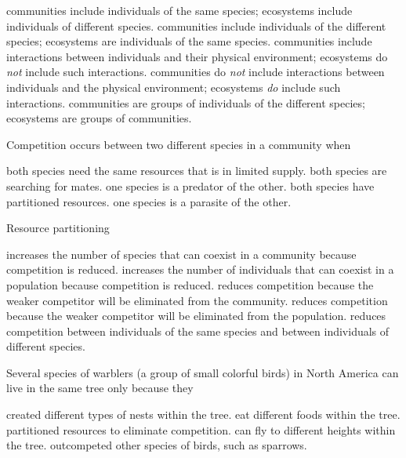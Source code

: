 \begin{choices}
\choice communities include individuals of the same species; ecosystems include individuals of different species.%
\choice communities include individuals of the different species; ecosystems are individuals of the same species.%
\choice communities include interactions between individuals and their physical environment; ecosystems do \emph{not} include such interactions.%
\correctchoice communities do \emph{not} include interactions between individuals and the physical environment; ecosystems \emph{do} include such interactions.%
\choice communities are groups of individuals of the different species; ecosystems are groups of communities.%
\end{choices}



\question
Competition occurs between two different species in a community when

\begin{choices}
\correctchoice both species need the same resources that is in limited supply.%
\choice both species are searching for mates.%
\choice one species is a predator of the other.%
\choice both species have partitioned resources.%
\choice one species is a parasite of the other.%
\end{choices}

\question
Resource partitioning

\begin{choices}
\choice increases the number of species that can coexist in a community because competition is reduced.%
\choice increases the number of individuals that can coexist in a population because competition is reduced.%
\choice reduces competition because the weaker competitor will be eliminated from the community.%
\choice reduces competition because the weaker competitor will be eliminated from the population.%
\choice reduces competition between individuals of the same species and between individuals of different species.%
\end{choices}

\question
Several species of warblers (a group of small colorful birds) in North America can live in the same tree only because they

\begin{choices}
\choice created different types of nests within the tree.%
\choice eat different foods within the tree.%
\correctchoice partitioned resources to eliminate competition.%
\choice can fly to different heights within the tree.%
\choice outcompeted other species of birds, such as sparrows.%
\end{choices}

